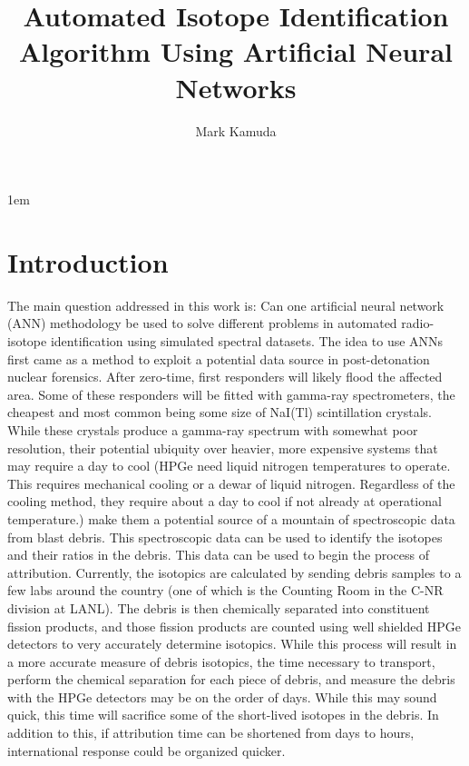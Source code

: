 \documentclass[thesis,tocnosub,noragright,centerchapter,12pt,fullpage]{uiucecethesis09}
\title{Automated Isotope Identification Algorithm Using Artificial Neural Networks}
\author{Mark Kamuda}
\begin{document}
%

%
\maketitle

\parindent 1em%

\frontmatter

\tableofcontents

\listoftables

\listoffigures

\mainmatter


\chapter{Introduction}

The main question addressed in this work is: Can one artificial neural network (ANN) methodology be used to solve different problems in automated radio-isotope identification using simulated spectral datasets. The idea to use ANNs first came as a method to exploit a potential data source in post-detonation nuclear forensics. After zero-time, first responders will likely flood the affected area. Some of these responders will be fitted with gamma-ray spectrometers, the cheapest and most common being some size of NaI(Tl) scintillation crystals. While these crystals produce a gamma-ray spectrum with somewhat poor resolution, their potential ubiquity over heavier, more expensive systems that may require a day to cool (HPGe need liquid nitrogen temperatures to operate. This requires mechanical cooling or a dewar of liquid nitrogen. Regardless of the cooling method, they require about a day to cool if not already at operational temperature.) make them a potential source of a mountain of spectroscopic data from blast debris. This spectroscopic data can be used to identify the isotopes and their ratios in the debris. This data can be used to begin the process of attribution. Currently, the isotopics are calculated by sending debris samples to a few labs around the country (one of which is the Counting Room in the C-NR division at LANL). The debris is then chemically separated into constituent fission products, and those fission products are counted using well shielded HPGe detectors to very accurately determine isotopics. While this process will result in a more accurate measure of debris isotopics, the time necessary to transport, perform the chemical separation for each piece of debris, and measure the debris with the HPGe detectors may be on the order of days. While this may sound quick, this time will sacrifice some of the short-lived isotopes in the debris. In addition to this, if attribution time can be shortened from days to hours, international response could be organized quicker. 
\end{document}
